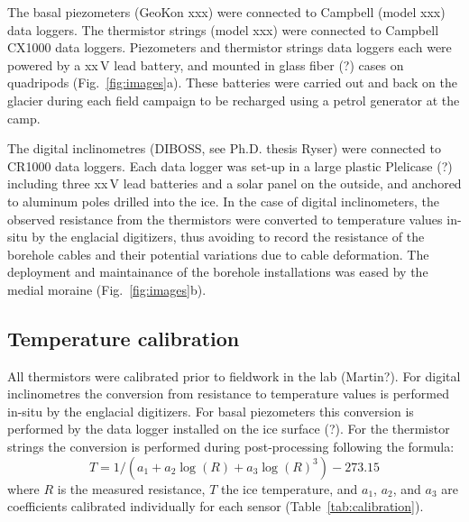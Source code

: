 \documentclass[utf8]{article}
\begin{document}
    The basal piezometers (GeoKon xxx) were connected to Campbell (model xxx)
    data loggers. The thermistor strings (model xxx) were connected to
    Campbell CX1000 data loggers. Piezometers and thermistor strings data
    loggers each were powered by a xx\,V lead battery, and mounted in glass
    fiber (?) cases on quadripods (Fig.~\ref{fig:images}a). These batteries
    were carried out and
    back on the glacier during each field campaign to be recharged using a
    petrol generator at the camp.

    The digital inclinometres (DIBOSS, see Ph.D. thesis Ryser) were connected
    to CR1000 data loggers. Each data logger was set-up in a large plastic
    Plelicase (?) including three xx\,V lead batteries and a solar panel on the
    outside, and anchored to aluminum poles drilled into the ice.
    In the case of digital inclinometers, the observed resistance from the
    thermistors were converted to temperature values in-situ by the englacial
    digitizers, thus avoiding to record the resistance of the borehole cables
    and their potential variations due to cable deformation. The deployment and
    maintainance of the borehole installations was eased by the medial moraine
    (Fig.~\ref{fig:images}b).


\subsection{Temperature calibration}

    All thermistors were calibrated prior to fieldwork in the lab (Martin?).
    For digital inclinometres the conversion from resistance to temperature
    values is performed in-situ by the englacial digitizers. For basal
    piezometers this conversion is performed by the data logger installed on
    the ice surface (?). For the thermistor strings the conversion is performed
    during post-processing following the formula:
    \begin{equation}
      T = 1 / (a_1 + a_2 \log(R) + a_3 \log(R)^3) - 273.15
    \end{equation}
    where $R$ is the measured resistance, $T$ the ice temperature, and $a_1$,
    $a_2$, and $a_3$ are coefficients calibrated individually for each sensor
    (Table~\ref{tab:calibration}).
\end{document}
